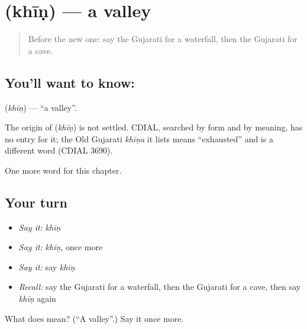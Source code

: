 \section[\texorpdfstring{\gu{ખીણ} (khīṇ)}{ખીણ (khīṇ)}]{ (khīṇ) — a valley}

\label{lesson:GU-C119-khin}



\begin{quote}
Before the new one: say the Gujarati for a waterfall, then the Gujarati for a cave.
\end{quote}

\subsection*{You'll want to know: }
\textbf{} (\emph{khīṇ}) — \textquotedblleft{}a valley\textquotedblright{}.

\begin{cousinweb}
The origin of \textbf{} (\emph{khīṇ}) is not settled. CDIAL, searched by form and by meaning, has no entry for it; the Old Gujarati \emph{khīṇa} it lists means \textquotedblleft{}exhausted\textquotedblright{} and is a different word (CDIAL 3690).
\end{cousinweb}

\begin{grammarlens}[title={What you've built}]
One more word for this chapter.
\end{grammarlens}

\subsection*{Your turn}
\begin{itemize}
\raggedright
  \item \emph{Say it:} \emph{khīṇ}
  \item \emph{Say it:} \emph{khīṇ}, once more
  \item \emph{Say it:} say \emph{khīṇ}
  \item \emph{Recall:} say the Gujarati for a waterfall, then the Gujarati for a cave, then say \emph{khīṇ} again
\end{itemize}

\begin{tcolorbox}[breakable,colback=teal!4,colframe=teal!35!black,title={Before you move on}]
What does  mean? (\textquotedblleft{}A valley\textquotedblright{}.) Say it once more.
\end{tcolorbox}
